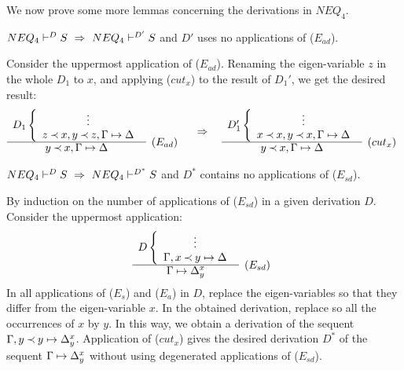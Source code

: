 We now prove some more lemmas concerning the derivations in $NEQ_4$.
\begin{LEMMA}\label{le:noEad}
 ${NEQ_4}\vdash^{{D}}S\ \mathrel\Rightarrow\ {NEQ_4}\vdash^{{D'}}S$ and $D'$ uses no applications of ($E_{ad}$).
\end{LEMMA}
\begin{PROOF}
Consider the uppermost application of ($E_{ad}$).
Renaming the eigen-variable $z$ in the whole $D_1$ to $x$, and applying ($cut_x$)
to the result of $D_1'$, we get the desired result:
\[ \begin{array}{cl}
D_1 \left \{ \begin{array}{c}
 \vdots \\
 z\Incl x, y\Incl z, \Gamma\Seq\Delta \end{array} \right . \\ \cline{1-1}
 y \Incl x, \Gamma\Seq\Delta & \raisebox{1.2ex}[1.5ex][0ex]{$(E_{ad})$}
\end{array} 
\conv
\begin{array}{cl}
D_1' \left \{ \begin{array}{c}
 \vdots \\
 x\Incl x, y\Incl x, \Gamma\Seq\Delta \end{array} \right . \\ \cline{1-1}
 y \Incl x, \Gamma\Seq\Delta & \raisebox{1.2ex}[1.5ex][0ex]{$(cut_x)$}
\end{array} \]
\end{PROOF}

\begin{LEMMA}\label{le:noEsd} ${NEQ_4}\vdash^{{D}}S\ \mathrel\Rightarrow\ {NEQ_4}\vdash^{{D^*}}S$
and $D^*$ contains no applications of ($E_{sd}$).
\end{LEMMA}
\begin{PROOF}
By induction on the number of applications of ($E_{sd}$) in a given
derivation $D$. Consider the uppermost application:
\[ \begin{array}{cl}
D\left\{ \begin{array}{c}
 \vdots \\
 \Gamma,x\Incl y\Seq\Delta \end{array} \right. \\ \cline{1-1}
 \Gamma\Seq\Delta_y^x  &  \raisebox{1.2ex}[1.5ex][0ex]{($E_{sd}$)}
\end{array} \]
In all applications of ($E_s$) and ($E_a$) in $D$, replace the
eigen-variables so that they differ from the eigen-variable $x$. In the obtained
derivation, replace so all the occurrences of $x$ by $y$. In this way, we 
obtain a derivation of the sequent $\Gamma,y\mathbin{\prec} y\mathrel{\mapsto}\Delta_y^x$. 
Application of ($cut_x$) gives the desired derivation $D^*$ of the
sequent $\Gamma\mathrel{\mapsto}\Delta_y^x$ 
without using degenerated applications of ($E_{sd}$).
\end{PROOF}
%
%


